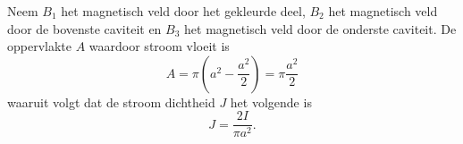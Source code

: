 
\begin{description}[labelwidth=1.5cm, leftmargin=!]
    \item[Opl. :]  
    
        Neem $B_1$ het magnetisch veld door het gekleurde deel, $B_2$ het magnetisch veld door de bovenste caviteit en $B_3$ het magnetisch veld door de onderste caviteit.
        De oppervlakte $A$ waardoor stroom vloeit is
        \begin{equation*}
            A = \pi\left(a^2 - \frac{a^2}{2}\right) = \pi\frac{a^2}{2}
        \end{equation*}
        waaruit volgt dat de stroom dichtheid $J$ het volgende is
        \begin{equation*}
            J = \frac{2I}{\pi a^2}.
        \end{equation*}        
\end{description}

